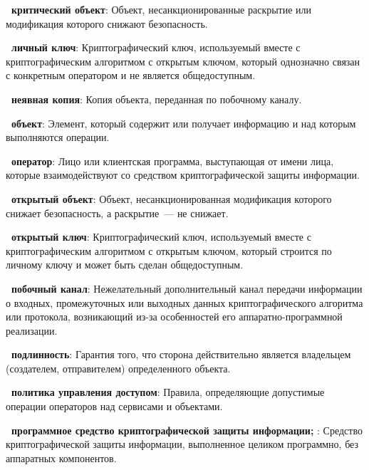 {\bf \thedefctr~критический объект}: 
Объект, несанкционированные раскрытие или модификация которого 
снижают безопасность.

{\bf \thedefctr~личный ключ}:
Криптографический ключ, используемый
вместе с криптографическим алгоритмом с открытым ключом, 
который однозначно связан с конкретным оператором 
и не является общедоступным.


{\bf \thedefctr~неявная копия}:
Копия объекта, переданная по побочному каналу.

{\bf \thedefctr~объект}: 
Элемент, который содержит или получает информацию
и над которым выполняются операции.

{\bf \thedefctr~оператор}:
Лицо или клиентская программа, выступающая от имени лица, 
которые взаимодействуют со средством криптографической защиты 
информации.

{\bf \thedefctr~открытый объект}: 
Объект, несанкционированная модификация 
которого снижает безопасность, 
а раскрытие~--- не снижает.

{\bf \thedefctr~открытый ключ}:
Криптографический ключ, используемый 
вместе с криптографическим алгоритмом с открытым ключом, 
который строится по личному ключу  
и может быть сделан общедоступным.


{\bf \thedefctr~побочный канал}:
Нежелательный дополнительный канал передачи информации о 
входных, промежуточных или выходных данных 
криптографического алгоритма или протокола, 
возникающий из-за особенностей его 
аппаратно-программной реализации.

{\bf \thedefctr~подлинность}:
Гарантия того, что сторона действительно 
является владельцем (создателем, отправителем) 
определенного объекта.

{\bf \thedefctr~политика управления доступом}:
Правила, определяющие допустимые операции 
операторов над сервисами и объектами.

{\bf \thedefctr~программное средство криптографической защиты информации; \TOE}:
Средство криптографической защиты информации, выполненное целиком программно, 
без аппаратных компонентов. 

